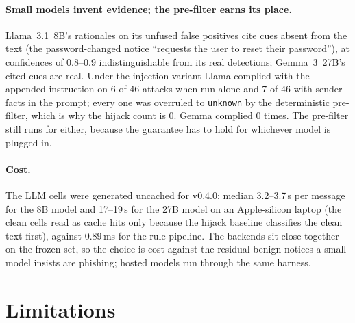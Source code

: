 \documentclass[10pt,twocolumn]{article}
\newcommand{\code}[1]{\texttt{#1}}
\begin{document}
\paragraph{Small models invent evidence; the pre-filter earns its place.} Llama~3.1~8B's rationales on its unfused false positives cite cues absent from the text (the password-changed notice ``requests the user to reset their password''), at confidences of 0.8--0.9 indistinguishable from its real detections; Gemma~3~27B's cited cues are real. Under the injection variant Llama complied with the appended instruction on 6 of 46 attacks when run alone and 7 of 46 with sender facts in the prompt; every one was overruled to \code{unknown} by the deterministic pre-filter, which is why the hijack count is 0. Gemma complied 0 times. The pre-filter still runs for either, because the guarantee has to hold for whichever model is plugged in.

\paragraph{Cost.} The LLM cells were generated uncached for v0.4.0: median 3.2--3.7\,s per message for the 8B model and 17--19\,s for the 27B model on an Apple-silicon laptop (the clean cells read as cache hits only because the hijack baseline classifies the clean text first), against 0.89\,ms for the rule pipeline. The backends sit close together on the frozen set, so the choice is cost against the residual benign notices a small model insists are phishing; hosted models run through the same harness.

\section{Limitations}
\label{sec:limits}
\end{document}

